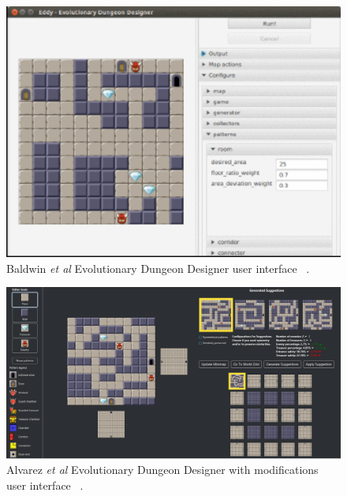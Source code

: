 \documentclass[journal]{IEEEtran}
\begin{document}
\begin{figure}[h]
	\includegraphics[width=1.0\linewidth]{EDD.PNG}
	\caption{ Baldwin \textit{et al} Evolutionary Dungeon Designer user interface  ~\cite{baldwin2017mixed}.}
	\label{EDD}
\end{figure} 

\begin{figure}[h]
	\includegraphics[width=1.0\linewidth]{EDD2.PNG}
	\caption{ Alvarez \textit{et al} Evolutionary Dungeon Designer with modifications user interface  ~\cite{alvarez2018fostering}.}
	\label{EDD2}
\end{figure} 
\end{document}
